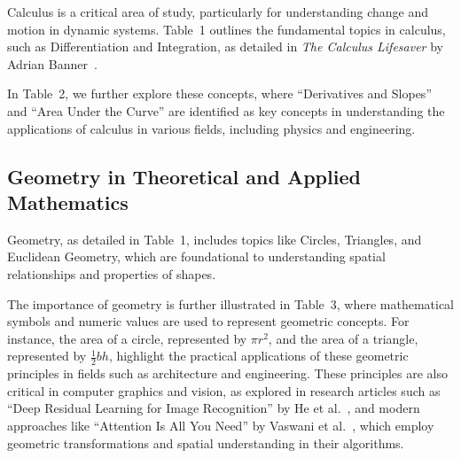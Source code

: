 \documentclass{article}
\begin{document}
Calculus is a critical area of study, particularly for understanding change and motion in dynamic systems. Table~1 outlines the fundamental topics in calculus, such as Differentiation and Integration, as detailed in \textit{The Calculus Lifesaver} by Adrian Banner~\cite{banner}. 

In Table~2, we further explore these concepts, where ``Derivatives and Slopes'' and ``Area Under the Curve'' are identified as key concepts in understanding the applications of calculus in various fields, including physics and engineering.

\subsection{Geometry in Theoretical and Applied Mathematics}

Geometry, as detailed in Table~1, includes topics like Circles, Triangles, and Euclidean Geometry, which are foundational to understanding spatial relationships and properties of shapes. 

The importance of geometry is further illustrated in Table~3, where mathematical symbols and numeric values are used to represent geometric concepts. For instance, the area of a circle, represented by $\pi r^2$, and the area of a triangle, represented by $\frac{1}{2}bh$, highlight the practical applications of these geometric principles in fields such as architecture and engineering. These principles are also critical in computer graphics and vision, as explored in research articles such as ``Deep Residual Learning for Image Recognition'' by He et al.~\cite{he}, and modern approaches like ``Attention Is All You Need'' by Vaswani et al.~\cite{vaswani}, which employ geometric transformations and spatial understanding in their algorithms.



\end{document}
